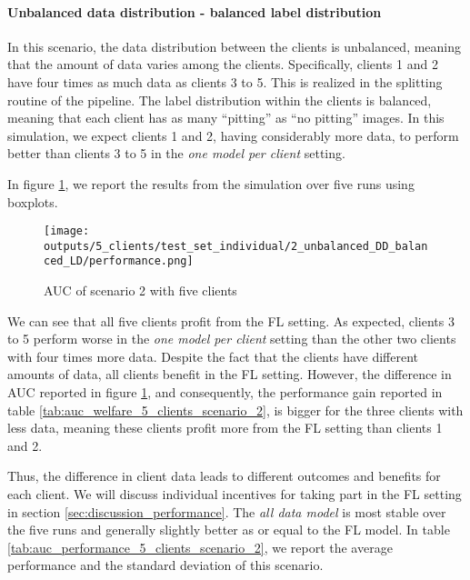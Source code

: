 \paragraph*{Unbalanced data distribution - balanced label distribution} In this scenario, the data distribution between the clients is unbalanced, meaning that the amount of data varies among the clients. Specifically, clients 1 and 2 have four times as much data as clients 3 to 5. This is realized in the splitting routine of the pipeline. The label distribution within the clients is balanced, meaning that each client has as many ``pitting'' as ``no pitting'' images. In this simulation, we expect clients 1 and 2, having considerably more data, to perform better than clients 3 to 5 in the \emph{one model per client} setting.

In figure \ref{fig:auc_box_5_clients_scenario_2}, we report the results from the simulation over five runs using boxplots.
\begin{figure}[htb!]
    \centering
    \texttt{[image: outputs/5\_clients/test\_set\_individual/2\_unbalanced\_DD\_balanced\_LD/performance.png]}
    \caption{AUC of scenario 2 with five clients}
    \label{fig:auc_box_5_clients_scenario_2}
\end{figure}
We can see that all five clients profit from the FL setting. As expected, clients 3 to 5 perform worse in the \emph{one model per client} setting than the other two clients with four times more data. Despite the fact that the clients have different amounts of data, all clients benefit in the FL setting. However, the difference in AUC reported in figure \ref{fig:auc_box_5_clients_scenario_2}, and consequently, the performance gain reported in table \ref{tab:auc_welfare_5_clients_scenario_2}, is bigger for the three clients with less data, meaning these clients profit more from the FL setting than clients 1 and 2.

Thus, the difference in client data leads to different outcomes and benefits for each client. We will discuss individual incentives for taking part in the FL setting in section \ref{sec:discussion_performance}. The \emph{all data model} is most stable over the five runs and generally slightly better as or equal to the FL model. In table \ref{tab:auc_performance_5_clients_scenario_2}, we report the average performance and the standard deviation of this scenario.


